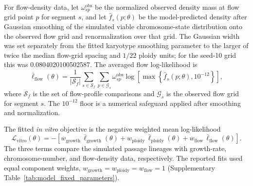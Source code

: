 \documentclass[11pt]{article}
\begin{document}
For flow-density data, let $\omega^{\mathrm{obs}}_{sp}$ be the normalized observed density mass at flow grid point $p$ for segment $s$, and let $\widehat f_s(p;\theta)$ be the model-predicted density after Gaussian smoothing of the simulated viable chromosome-state distribution onto the observed flow grid and renormalization over that grid. The Gaussian width was set separately from the fitted karyotype smoothing parameter to the larger of twice the median flow-grid spacing and $1/22$ ploidy units; for the seed-10 grid this was 0.0804020100502587. The averaged flow log-likelihood is
\begin{equation}
\bar\ell_{\mathrm{flow}}(\theta)
=
\frac{1}{|\mathcal S_f|}
\sum_{s\in\mathcal S_f}
\sum_{p\in\mathcal G_s}
 \omega^{\mathrm{obs}}_{sp}
 \log\left[\max\left\{\widehat f_s(p;\theta),10^{-12}\right\}\right],
\label{eq:appendix_invitro_flow_ll}
\end{equation}
where $\mathcal S_f$ is the set of flow-profile comparisons and $\mathcal G_s$ is the observed flow grid for segment $s$. The $10^{-12}$ floor is a numerical safeguard applied after smoothing and normalization.

The fitted \textit{in vitro} objective is the negative weighted mean log-likelihood
\begin{equation}
\mathcal L_{\mathrm{vitro}}(\theta)
=
-\left[
 w_{\mathrm{growth}}\,\bar\ell_{\mathrm{growth}}(\theta)
 +w_{\mathrm{ploidy}}\,\bar\ell_{\mathrm{ploidy}}(\theta)
 +w_{\mathrm{flow}}\,\bar\ell_{\mathrm{flow}}(\theta)
\right].
\label{eq:appendix_invitro_objective}
\end{equation}
The three terms compare the simulated passage lineages with growth-rate, chromosome-number, and flow-density data, respectively. The reported fits used equal component weights, $w_{\mathrm{growth}}=w_{\mathrm{ploidy}}=w_{\mathrm{flow}}=1$ (Supplementary Table~\ref{tab:model_fixed_parameters}).
\end{document}
